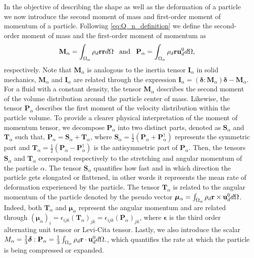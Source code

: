In the objective of describing the shape as well as the deformation of a particle we now introduce the second moment of mass and first-order moment of momentum of a particle. 
Following \ref{eq:Q_n_definition} we define the second-order moment of mass and the first-order moment of momentum as 
\begin{equation}
    \textbf{M}_\alpha 
    = \intO{ \rho_d \textbf{r} \textbf{r} }
    \;\;\;\text{and}\;\;\;
    \textbf{P}_\alpha 
    = \intO{ \rho_d \textbf{r} \textbf{u}_d^0 },
    \label{eq:first_moment_of_momentum_def}
\end{equation}
respectively. 
Note that $\textbf{M}_\alpha$ is analogous to the inertia tensor $\textbf{I}_\alpha$ in solid mechanics, $\textbf{M}_\alpha$ and $\textbf{I}_\alpha$ are related through the expression $\textbf{I}_\alpha = (\bm\delta : \textbf{M}_\alpha)\bm\delta - \textbf{M}_\alpha$.
For a fluid with a constant density, the tensor $\textbf{M}_\alpha$ describes the second moment of the volume distribution around the particle center of mass.
Likewise, the tensor $\textbf{P}_\alpha$ describes the first moment of the velocity distribution within the particle volume. 
To provide a clearer physical interpretation of the moment of momentum tensor, we decompose $\textbf{P}_\alpha$ into two distinct parts, denoted as $\textbf{S}_\alpha$ and $\textbf{T}_\alpha$ such that,
$\textbf{P}_\alpha = \textbf{S}_\alpha+\textbf{T}_\alpha$, where $\textbf{S}_\alpha = \frac{1}{2}(\textbf{P}_\alpha + \textbf{P}_\alpha^\dagger)$ represents the symmetric part and $\textbf{T}_\alpha = \frac{1}{2}(\textbf{P}_\alpha - \textbf{P}_\alpha^\dagger)$ is the antisymmetric part of $\textbf{P}_\alpha$.
Then, the tensors $\textbf{S}_\alpha$ and $\textbf{T}_\alpha$ correspond respectively to the stretching and angular momentum of the particle $\alpha$. 
The tensor $\textbf{S}_\alpha$ quantifies how fast and in which direction the particle gets elongated or flattened, in other words it represents the mean rate of deformation experienced by the particle.
The tensor $\textbf{T}_\alpha$ is related to the angular momentum of the particle denoted by the pseudo vector $\bm\mu_\alpha = \int_{\Omega_{\alpha}}  \rho_d \textbf{r} \times \textbf{u}_d^0  d\Omega$. 
Indeed, both  $\textbf{T}_\alpha$ and $\bm{\mu}_\alpha$ represent the angular momentum and are related through $(\bm{\mu}_\alpha)_i = \epsilon_{ijk} (\textbf{T}_\alpha)_{jk} = \epsilon_{ijk} (\textbf{P}_\alpha)_{jk}$, where $\bm\epsilon$ is the third order alternating unit tensor or Levi-Cita tensor. 
Lastly, we also introduce the scalar $M_\alpha =\frac{1}{3}\bm\delta : \textbf{P}_\alpha = \frac{1}{3}\int_{\Omega_{\alpha}}  \rho_d \textbf{r} \cdot \textbf{u}_d^0  d\Omega.$, which quantifies the rate at which the particle is being compressed or expanded.
